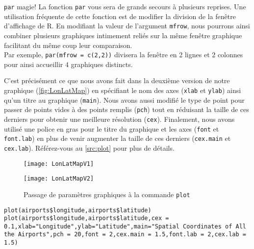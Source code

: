 \begin{moreInfo}{\texttt{par} magie!}
	La fonction \texttt{par} vous sera de grands secours à plusieurs reprises. Une utilisation fréquente de cette fonction est de modifier la division de la fenêtre d'affichage de R. En modifiant la valeur de l'argument \texttt{mfrow}, nous pourrons ainsi combiner plusieurs graphiques intimement reliés sur la même fenêtre graphique facilitant du même coup leur comparaison. \\
	Par exemple, \texttt{par(mfrow = c(2,2))} divisera la fenêtre en 2 lignes et 2 colonnes pour ainsi accueillir 4 graphiques distincts.
\end{moreInfo}

C'est précisément ce que nous avons fait dans la deuxième version de notre graphique (\autoref{fig:LonLatMap}) en spécifiant le nom des axes (\texttt{xlab} et \texttt{ylab}) ainsi qu'un titre au graphique (\texttt{main}). Nous avons aussi modifié le type de point pour passer de points vides à des points remplis (\texttt{pch}) tout en réduisant la taille de ces derniers pour obtenir une meilleure résolution (\texttt{cex}). Finalement, nous avons utilisé une police en gras pour le titre du graphique et les axes (\texttt{font} et \texttt{font.lab}) en plus de venir augmenter la taille de ces derniers (\texttt{cex.main} et \texttt{cex.lab}). Référez-vous au \autoref{src:plot} pour plus de détails. \\
	
\begin{figure}
	\begin{minipage}{\textwidth}
		\centering
		\texttt{[image: LonLatMapV1]}
	\end{minipage}
	\newline
	\begin{minipage}{\textwidth}
		\centering
		\texttt{[image: LonLatMapV2]}
	\end{minipage}
	\caption{Passage de paramètres graphiques à la commande \texttt{plot}}
\end{figure}
\label{fig:LonLatMap}

\begin{lstlisting}[caption = Utilisation de la commande \texttt{plot},label=src:plot]
plot(airports$longitude,airports$latitude)
plot(airports$longitude,airports$latitude,cex = 0.1,xlab="Longitude",ylab="Latitude",main="Spatial Coordinates of All the Airports",pch = 20,font = 2,cex.main = 1.5,font.lab = 2,cex.lab = 1.5)
\end{lstlisting}

